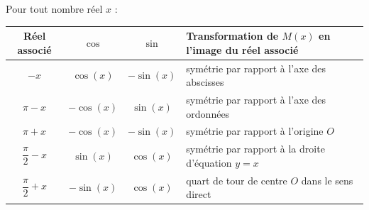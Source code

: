\begin{propriete}
	Pour tout nombre réel $x$ :
	\begin{center}
		\begin{tabular}{|c|c|c|l|} \hline
			\ccg Réel associé                          & \ccg $\cos$ & \ccg $\sin$ & \ccg Transformation de $M(x)$ en l'image du réel associé \\ \hline
			$-x$                                       & $\cos(x)$   & $-\sin(x)$  & symétrie par rapport à l'axe des abscisses               \\ \hline
			$\pi - x$                                  & $-\cos(x)$  & $\sin(x)$   & symétrie par rapport à l'axe des ordonnées               \\ \hline
			$\pi + x$                                  & $-\cos(x)$  & $-\sin(x)$  & symétrie par rapport à l'origine $O$                     \\ \hline\hline
			\rule[-4mm]{0mm}{11mm}$\dfrac{\pi}{2} - x$ & $\sin(x)$   & $\cos(x)$   & symétrie par rapport à la droite d'équation $y = x$      \\ \hline
			\rule[-4mm]{0mm}{11mm}$\dfrac{\pi}{2} + x$ & $-\sin(x)$  & $\cos(x)$   & quart de tour de centre $O$ dans le sens direct          \\ \hline
		\end{tabular}
	\end{center}
\end{propriete}

